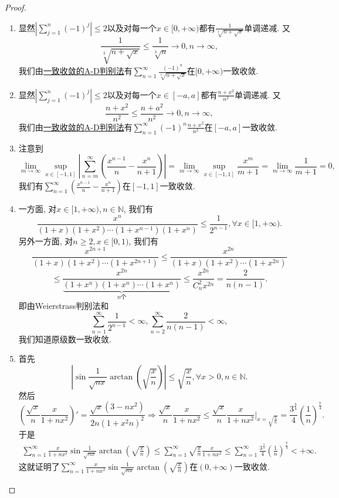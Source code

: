 \documentclass[../../main.tex]{subfiles}%
\begin{document}
\begin{proof}
\begin{enumerate}
\item 显然\(\left| \sum_{j=1}^{n} (-1)^j \right| \leqslant 2\)以及对每一个\(x \in [0, +\infty)\)都有\(\frac{1}{\sqrt[3]{n + \sqrt{x}}}\)单调递减. 又
\[
\frac{1}{\sqrt[3]{n + \sqrt{x}}} \leqslant \frac{1}{\sqrt[3]{n}} \to 0, n \to \infty,
\]
我们由\hyperref[theorem:级数一致收敛的A-D判别法]{一致收敛的A-D判别法}有\(\sum_{n=1}^{\infty} \frac{(-1)^n}{\sqrt[3]{n + \sqrt{x}}}\)在\([0, +\infty)\)一致收敛.

\item 显然\(\left| \sum_{j=1}^{n} (-1)^j \right| \leqslant 2\)以及对每一个\(x \in [-a, a]\)都有\(\frac{n + x^2}{n^2}\)单调递减. 又
\[
\frac{n + x^2}{n^2} \leqslant \frac{n + a^2}{n^2} \to 0, n \to \infty,
\]
我们由\hyperref[theorem:级数一致收敛的A-D判别法]{一致收敛的A-D判别法}有\(\sum_{n=1}^{\infty} (-1)^n \frac{n + x^2}{n^2}\)在\([-a, a]\)一致收敛.

\item 注意到
\[
\lim_{m \to \infty} \sup_{x \in [-1, 1]} \left| \sum_{n=m}^{\infty} \left( \frac{x^{n - 1}}{n} - \frac{x^n}{n + 1} \right) \right| = \lim_{m \to \infty} \sup_{x \in [-1, 1]} \frac{x^m}{m + 1} = \lim_{m \to \infty} \frac{1}{m + 1} = 0,
\]
我们有\(\sum_{n=1}^{\infty} \left( \frac{x^{n - 1}}{n} - \frac{x^n}{n + 1} \right)\)在\([-1, 1]\)一致收敛.

\item 一方面, 对\(x \in [1, +\infty), n \in \mathbb{N}\), 我们有
\[
\frac{x^n}{(1 + x)(1 + x^2) \cdots (1 + x^{n - 1})(1 + x^n)} \leqslant \frac{1}{2^{n - 1}}, \forall x \in [1, +\infty).
\]
另外一方面, 对\(n \geqslant 2, x \in [0, 1)\), 我们有
\[
\frac{x^{2n + 1}}{(1 + x)(1 + x^2) \cdots (1 + x^{2n + 1})} \leqslant \frac{x^{2n}}{(1 + x)(1 + x^2) \cdots (1 + x^{2n})}
\]
\[
\leqslant \frac{x^{2n}}{\underbrace{(1 + x^n)(1 + x^n) \cdots (1 + x^n)}_{n \text{个}}} \leqslant \frac{x^{2n}}{C_n^2 x^{2n}} = \frac{2}{n(n - 1)}.
\]
即由Weierstrass判别法和
\[
\sum_{n=1}^{\infty} \frac{1}{2^{n - 1}} < \infty, \sum_{n=2}^{\infty} \frac{2}{n(n - 1)} < \infty,
\]
我们知道原级数一致收敛.

\item 首先
\[
\left| \sin \frac{1}{\sqrt{nx}} \arctan \left( \sqrt{\frac{x}{n}} \right) \right| \leqslant \sqrt{\frac{x}{n}}, \forall x > 0, n \in \mathbb{N}.
\]
然后
\[
\left( \frac{\sqrt{x}}{n} \frac{x}{1 + nx^2} \right)' = \frac{\sqrt{x}(3 - nx^2)}{2n(1 + x^2 n)^2} \Rightarrow \frac{\sqrt{x}}{n} \frac{x}{1 + nx^2} \leqslant \frac{\sqrt{x}}{n} \frac{x}{1 + nx^2} \bigg|_{x = \sqrt{\frac{3}{n}}} = \frac{3^{\frac{3}{4}}}{4} \left( \frac{1}{n} \right)^{\frac{7}{4}}.
\]
于是
\begin{align*}
\sum_{n=1}^{\infty}{\frac{x}{1+nx^2}\sin \frac{1}{\sqrt{nx}}\arctan  \left( \sqrt{\frac{x}{n}} \right)}\leqslant \sum_{n=1}^{\infty}{\sqrt{\frac{x}{n}}\frac{x}{1+nx^2}}\leqslant \sum_{n=1}^{\infty}{\frac{3^{\frac{3}{4}}}{4}\left( \frac{1}{n} \right) ^{\frac{7}{4}}}<+\infty.
\end{align*}
这就证明了\(\sum_{n=1}^{\infty} \frac{x}{1 + nx^2} \sin \frac{1}{\sqrt{nx}} \arctan \left( \sqrt{\frac{x}{n}} \right)\)在\((0, +\infty)\)一致收敛.


\end{enumerate}
\end{proof}
\end{document}
